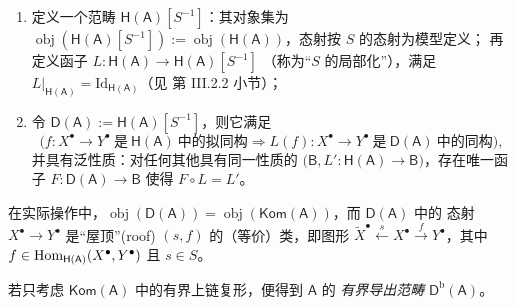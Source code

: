 \begin{Def}
\begin{enumerate}
\begin{enumerate}
\[\begin{gathered}
              \mathsf H(\mathsf A),\\
              W^\bullet\xrightarrow{t}X^\bullet\ \text{in}\ S
              \ \text{s.t.}\ f\circ t=s\circ g)
            \end{gathered}
          \]
          以及
          \[
            (\forall f,g:X^\bullet\to Y^\bullet\ \text{in}\ \mathsf H(\mathsf A):\
            \exists s\in S\ \text{s.t.}\ s\circ f=s\circ g
            \iff \exists t\in S\ \text{s.t.}\ f\circ t=g\circ t);
          \]
    \item[(c)] 定义一个范畴 $\mathsf H(\mathsf A)[S^{-1}]$：其对象集为
          $\operatorname{obj}(\mathsf H(\mathsf A)[S^{-1}]):=
          \operatorname{obj}(\mathsf H(\mathsf A))$，态射按 $S$ 的态射为模型定义；
          再定义函子 $L:\mathsf H(\mathsf A)\to\mathsf H(\mathsf A)[S^{-1}]$
          （称为“$S$ 的局部化”），满足 $L|_{\mathsf H(\mathsf A)}=
          \mathrm{Id}_{\mathsf H(\mathsf A)}$（见 \cite{GM03} 第 III.2.2 小节）；
    \item[(d)] 令 $\mathsf D(\mathsf A):=\mathsf H(\mathsf A)[S^{-1}]$，则它满足
          \[
            \bigl(f:X^\bullet\to Y^\bullet\ \text{是}\ \mathsf H(\mathsf A)\ \text{中的拟同构}
            \Longrightarrow L(f):X^\bullet\to Y^\bullet\ \text{是}\ 
            \mathsf D(\mathsf A)\ \text{中的同构}\bigr),
          \]
          并具有泛性质：对任何其他具有同一性质的 $\bigl(\mathsf B,
          L':\mathsf H(\mathsf A)\to\mathsf B\bigr)$，存在唯一函子
          $F:\mathsf D(\mathsf A)\to\mathsf B$ 使得 $F\circ L=L'$。
  \end{enumerate}
\end{enumerate}
在实际操作中，$\operatorname{obj}(\mathsf D(\mathsf A))=
\operatorname{obj}(\mathsf{Kom}(\mathsf A))$，而 $\mathsf D(\mathsf A)$ 中的
态射 $X^\bullet\to Y^\bullet$ 是“屋顶”(roof) $(s,f)$ 的（等价）类，即图形
$\tilde X^\bullet\xleftarrow{s}X^\bullet\xrightarrow{f}Y^\bullet$，其中
$f\in\operatorname{Hom}_{\mathsf H(\mathsf A)}(X^\bullet,Y^\bullet)$ 且 $s\in S$。

若只考虑 $\mathsf{Kom}(\mathsf A)$ 中的有界上链复形，便得到 $\mathsf A$ 的
\emph{有界导出范畴} $\mathsf D^{\mathrm b}(\mathsf A)$。
\end{Def}


